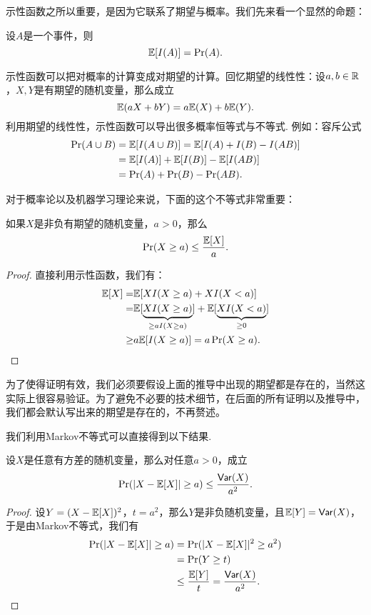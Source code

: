 示性函数之所以重要，是因为它联系了期望与概率。我们先来看一个显然的命题：
\begin{proposition}\label{prop:expectation-of-indicator-function}
    设$A$是一个事件，则
    \[
        \mathbb{E}[I(A)] = \Pr(A).
    \]
\end{proposition}

示性函数可以把对概率的计算变成对期望的计算。回忆期望的线性性：设$a,b\in\mathbb{R}$，$X,Y$是有期望的随机变量，那么成立
\[\mathbb{E}(aX+bY)=a\mathbb{E}(X)+b\mathbb{E}(Y).\]
利用期望的线性性，示性函数可以导出很多概率恒等式与不等式. 例如：容斥公式
\begin{align*}
    \Pr(A\cup B) &= \mathbb{E}[I(A\cup B)] = \mathbb{E}[I(A) + I(B) - I(AB)] \\
    &= \mathbb{E}[I(A)] +  \mathbb{E}[I(B)] -  \mathbb{E}[I(AB)]\\
    &= \Pr(A) + \Pr(B) - \Pr(AB).
\end{align*}

对于概率论以及机器学习理论来说，下面的这个不等式非常重要：

\begin{theorem}[Markov不等式]\label{thm:markov-inequality}
    如果$X$是非负有期望的随机变量，$a>0$，那么
        \[
            \Pr(X\geq a) \leq \frac{\mathbb{E}[X]}{a}.
        \]
\end{theorem}

\begin{proof}
直接利用示性函数，我们有：
    \begin{align*}
        \mathbb{E}[X] = &\mathbb{E}[X I(X\geq a)+X I(X<a)]\\
        =&\mathbb{E}[\underbrace{X I(X\geq a)}_{\geq aI(X\geq a)}]+\mathbb{E}[\underbrace{XI(X<a)}_{\geq 0}]\\
        \geq& a\mathbb{E}[I(X\geq a)]=a\Pr(X\geq a).
    \end{align*}
\end{proof}

\begin{remark}
    为了使得证明有效，我们必须要假设上面的推导中出现的期望都是存在的，当然这实际上很容易验证。为了避免不必要的技术细节，在后面的所有证明以及推导中，我们都会默认写出来的期望是存在的，不再赘述。
\end{remark}

我们利用Markov不等式可以直接得到以下结果. 
\begin{corollary}[Chebyshev不等式]\label{cor:chebyshev-inequality}
设$X$是任意有方差的随机变量，那么对任意$a>0$，成立
    \[
        \Pr(|X - \mathbb{E}[X]| \geq a) \leq \frac{\mathsf{Var}(X)}{a^2}.
    \]
\end{corollary}
\begin{proof}
设$Y=(X-\mathbb{E}[X])^2$，$t=a^2$，那么$Y$是非负随机变量，且$\mathbb{E}[Y]=\mathsf{Var}(X)$，于是由Markov不等式，我们有
\begin{align*}
    \Pr(|X - \mathbb{E}[X]| \geq a) &= \Pr(|X - \mathbb{E}[X]|^2 \geq a^2) \\
    &=\Pr(Y \geq t) \\
    &\leq \frac{\mathbb{E}[Y]}{t}=\frac{\mathsf{Var}(X)}{a^2}.
\end{align*}
\end{proof}

